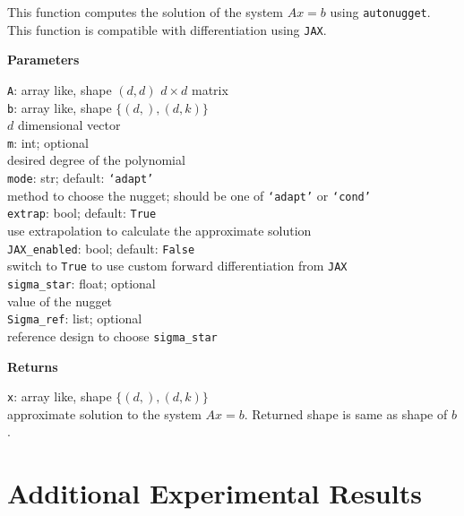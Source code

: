 \documentclass[10pt]{article} %
\begin{document}
This function computes the solution of the system $Ax=b$ using \texttt{autonugget}. This function is compatible with differentiation using \texttt{JAX}.

\textbf{Parameters}

\texttt{A}: array like, shape $(d,d)$ \newline
\hspace*{1cm}  $d \times d$ matrix \\
\texttt{b}: array like, shape $\{(d,), ( d, k)\}$ \\
\hspace*{1cm}    $d$ dimensional vector \\
\texttt{m}: int; optional \\
\hspace*{1cm}      desired degree of the polynomial \\
\texttt{mode}: str; default: \texttt{`adapt'} \\
\hspace*{1cm}      method to choose the nugget; should be one of \texttt{`adapt'} or \texttt{`cond'}\\
\texttt{extrap}: bool; default: \texttt{True}\\
\hspace*{1cm}      use extrapolation to calculate the approximate solution\\
\texttt{JAX\_enabled}: bool; default: \texttt{False}\\
\hspace*{1cm}      switch to \texttt{True} to use custom forward differentiation from \texttt{JAX}\\
\texttt{sigma\_star}: float; optional\\
\hspace*{1cm}      value of the nugget\\
\texttt{Sigma\_ref}: list; optional\\
\hspace*{1cm}     reference design to choose \texttt{sigma\_star}

\textbf{Returns}

\texttt{x}: array like, shape  $\{(d,), ( d, k)\}$\\
\hspace*{1cm}      approximate solution to the system $Ax = b$. Returned shape is same as shape of $b$.

\section{Additional Experimental Results}
\label{app: extra}
\end{document}
